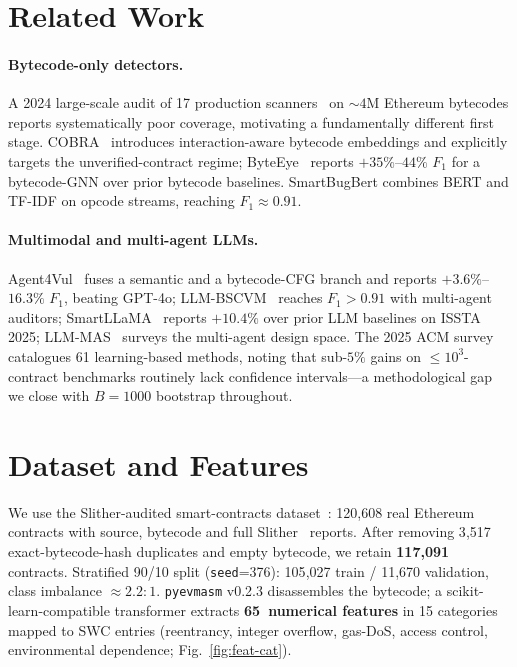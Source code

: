 \documentclass[twocolumn, 10pt]{article}
\begin{document}
\section{Related Work}\label{sec:relwork}

\paragraph{Bytecode-only detectors.}
A 2024 large-scale audit of 17 production
scanners~\cite{scannerstudy} on $\sim\!4$M Ethereum bytecodes reports
systematically poor coverage, motivating a fundamentally different
first stage. COBRA~\cite{cobra} introduces interaction-aware
bytecode embeddings and explicitly targets the unverified-contract
regime; ByteEye~\cite{byteeye} reports $+35\%$--$44\%$ $F_1$ for a
bytecode-GNN over prior bytecode baselines. SmartBugBert
\cite{smartbugbert} combines BERT and TF-IDF on opcode streams,
reaching $F_1\!\approx\!0.91$.

\paragraph{Multimodal and multi-agent LLMs.}
Agent4Vul~\cite{agent4vul} fuses a semantic and a bytecode-CFG
branch and reports $+3.6\%$--$16.3\%$ $F_1$, beating GPT-4o;
LLM-BSCVM~\cite{llmbscvm} reaches $F_1\!>\!0.91$ with multi-agent
auditors; SmartLLaMA~\cite{smartllama} reports $+10.4\%$ over prior
LLM baselines on ISSTA 2025; LLM-MAS~\cite{llmmas} surveys the
multi-agent design space. The 2025 ACM survey~\cite{learnSurvey}
catalogues 61 learning-based methods, noting that sub-$5\%$ gains on
$\le\!10^{3}$-contract benchmarks routinely lack confidence
intervals---a methodological gap we close with $B\!=\!1000$
bootstrap throughout.

\section{Dataset and Features}\label{sec:data}

We use the Slither-audited smart-contracts
dataset~\cite{slitherAudited}: 120{,}608 real Ethereum contracts with
source, bytecode and full Slither~\cite{slither} reports. After
removing 3{,}517 exact-bytecode-hash duplicates and empty bytecode,
we retain \textbf{117{,}091} contracts. Stratified 90/10 split
(\texttt{seed}=376): 105{,}027 train / 11{,}670 validation, class
imbalance ${\approx}2.2\!:\!1$. \texttt{pyevmasm} v0.2.3 disassembles
the bytecode; a scikit-learn-compatible transformer extracts
\textbf{65~numerical features} in 15 categories mapped to SWC entries
(reentrancy, integer overflow, gas-DoS, access control, environmental
dependence; Fig.~\ref{fig:feat-cat}).
\end{document}
